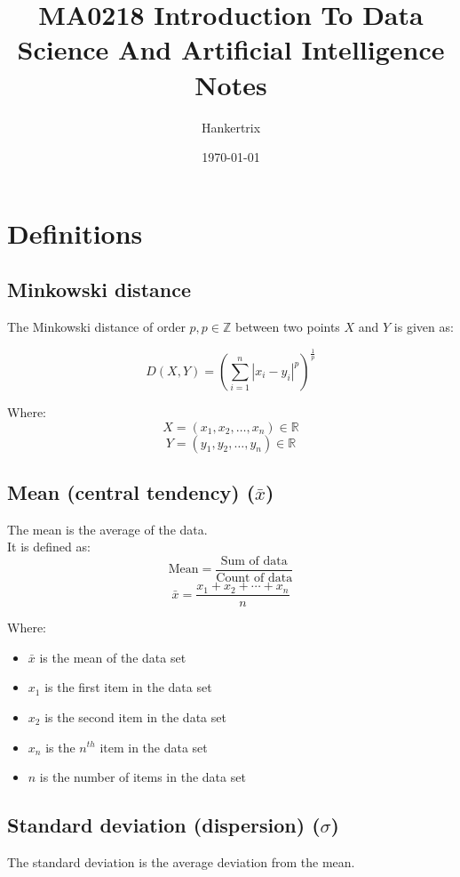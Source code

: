 \documentclass[11pt]{article}
\author{Hankertrix}
\date{\today}
\title{MA0218 Introduction To Data Science And Artificial Intelligence Notes}
\begin{document}
\maketitle
\setcounter{tocdepth}{2}
\tableofcontents \clearpage\section{Definitions}
\label{sec:orgae315f1}

\subsection{Minkowski distance}
\label{sec:orgaeb5c88}
The Minkowski distance of order \(p, p \in \mathbb{Z}\) between two points \(X\) and \(Y\) is given as:

\[D(X, Y) = \left(\sum_{i = 1}^n \left| x_i - y_i \right|^p \right)^{\frac{1}{p}}\]

Where:
\[X = \left(x_1, x_2, \ldots, x_n \right) \in \mathbb{R}\]
\[Y = \left(y_1, y_2, \ldots, y_n \right) \in \mathbb{R}\]
\subsection{Mean (central tendency) (\(\bar{x}\))}
\label{sec:orgcd2b037}
The mean is the average of the data.  \\

It is defined as:
\[\text{Mean} = \frac{\text{Sum of data}}{\text{Count of data}}\]
\[\bar{x} = \frac{x_1 + x_2 + \cdots + x_n}{n}\]

Where:
\begin{itemize}
\item \(\bar{x}\) is the mean of the data set
\item \(x_1\) is the first item in the data set
\item \(x_2\) is the second item in the data set
\item \(x_n\) is the \(n^{th}\) item in the data set
\item \(n\) is the number of items in the data set
\end{itemize}

 \newpage
\subsection{Standard deviation (dispersion) (\(\sigma\))}
\label{sec:org2d1ec1d}
The standard deviation is the average deviation from the mean.  \\
\end{document}
